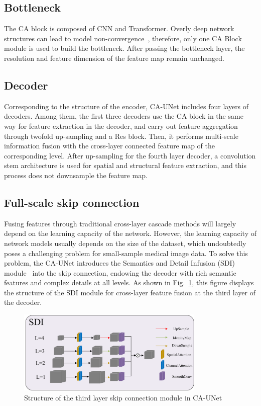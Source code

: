 \subsection{Bottleneck}
The CA block is composed of CNN and Transformer. Overly deep network structures can lead to model non-convergence~\cite{fu2020domain}, therefore, only one CA Block module is used to build the bottleneck. After passing the bottleneck layer, the resolution and feature dimension of the feature map remain unchanged.

\subsection{Decoder}
Corresponding to the structure of the encoder, CA-UNet includes four layers of decoders. Among them, the first three decoders use the CA block in the same way for feature extraction in the decoder, and carry out feature aggregation through twofold up-sampling and a Res block. Then, it performs multi-scale information fusion with the cross-layer connected feature map of the corresponding level. After up-sampling for the fourth layer decoder, a convolution stem architecture is used for spatial and structural feature extraction, and this process does not downsample the feature map.

\subsection{Full-scale skip connection}
Fusing features through traditional cross-layer cascade methods will largely depend on the learning capacity of the network. However, the learning capacity of network models usually depends on the size of the dataset, which undoubtedly poses a challenging problem for small-sample medical image data. To solve this problem, the CA-UNet introduces the Semantics and Detail Infusion (SDI) module~\cite{peng2023u} into the skip connection, endowing the decoder with rich semantic features and complex details at all levels. As shown in Fig.~\ref{sdi}, this figure displays the structure of the SDI module for cross-layer feature fusion at the third layer of the decoder.

\begin{figure}[htbp]
    \centering
    \includegraphics[width=0.8\textwidth]{images/sdi.png}
    \caption{Structure of the third layer skip connection module in CA-UNet} \label{sdi}
    \end{figure}


